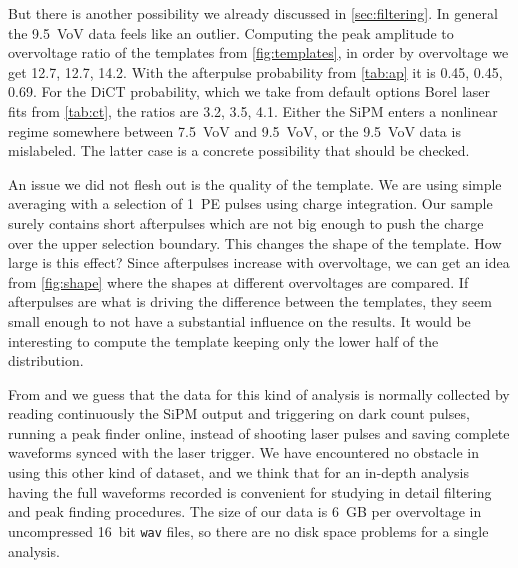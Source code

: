 But there is another possibility we already discussed in
\autoref{sec:filtering}. In general the \SI{9.5}{VoV} data feels like an
outlier. Computing the peak amplitude to overvoltage ratio of the templates
from \autoref{fig:templates}, in order by overvoltage we get 12.7, 12.7, 14.2.
With the afterpulse probability from \autoref{tab:ap} it is 0.45, 0.45, 0.69.
For the DiCT probability, which we take from default options Borel laser fits
from \autoref{tab:ct}, the ratios are 3.2, 3.5, 4.1. Either the SiPM enters a
nonlinear regime somewhere between \SI{7.5}{VoV} and \SI{9.5}{VoV}, or the
\SI{9.5}{VoV} data is mislabeled. The latter case is a concrete possibility
that should be checked.


An issue we did not flesh out is the quality of the template. We are using
simple averaging with a selection of 1~PE pulses using charge integration. Our
sample surely contains short afterpulses which are not big enough to push the
charge over the upper selection boundary. This changes the shape of the
template. How large is this effect? Since afterpulses increase with
overvoltage, we can get an idea from \autoref{fig:shape} where the shapes at
different overvoltages are compared. If afterpulses are what is driving the
difference between the templates, they seem small enough to not have a
substantial influence on the results. It would be interesting to compute the
template keeping only the lower half of the distribution.


From \cite{savarese2018} and \cite{nagy2014} we guess that the data for this
kind of analysis is normally collected by reading continuously the SiPM output
and triggering on dark count pulses, running a peak finder online, instead of
shooting laser pulses and saving complete waveforms synced with the laser
trigger. We have encountered no obstacle in using this other kind of dataset,
and we think that for an in-depth analysis having the full waveforms recorded
is convenient for studying in detail filtering and peak finding procedures. The
size of our data is \SI{6}{GB} per overvoltage in uncompressed \SI{16}{bit}
\texttt{wav} files, so there are no disk space problems for a single analysis.

